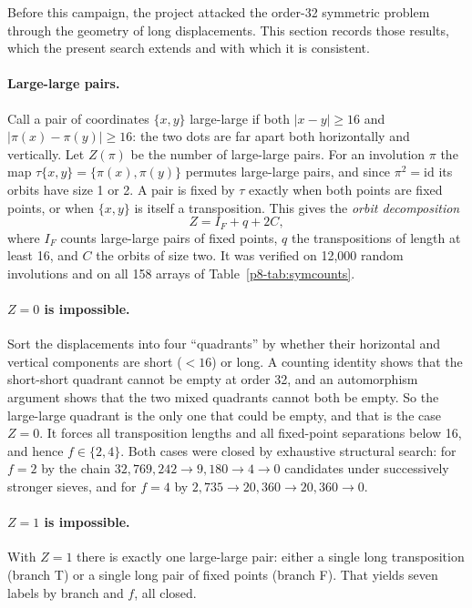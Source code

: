 \documentclass[11pt,a4paper,oneside]{report}
\theoremstyle{definition}
\begin{document}

Before this campaign, the project attacked the order-32 symmetric problem through the
geometry of long displacements. This section records those results, which the present
search extends and with which it is consistent.

\paragraph{Large-large pairs.} Call a pair of coordinates $\{x,y\}$ large-large if
both $|x-y|\ge16$ and $|\pi(x)-\pi(y)|\ge16$: the two dots are far apart both horizontally and
vertically. Let $Z(\pi)$ be the number of large-large pairs. For an involution $\pi$ the map
$\tau\{x,y\}=\{\pi(x),\pi(y)\}$ permutes large-large pairs, and since $\pi^2=\mathrm{id}$ its
orbits have size 1 or 2. A pair is fixed by $\tau$ exactly when both points are fixed points,
or when $\{x,y\}$ is itself a transposition. This gives the \emph{orbit decomposition}
\[
Z = I_F + q + 2C,
\]
where $I_F$ counts large-large pairs of fixed points, $q$ the transpositions of length at
least 16, and $C$ the orbits of size two. It was verified on 12{,}000 random involutions and
on all 158 arrays of Table~\ref{p8-tab:symcounts}.

\paragraph{$Z=0$ is impossible.} Sort the displacements into four ``quadrants'' by whether
their horizontal and vertical components are short ($<16$) or long. A counting identity shows
that the short-short quadrant cannot be empty at order 32, and an automorphism argument shows
that the two mixed quadrants cannot both be empty. So the large-large quadrant is the only one
that could be empty, and that is the case $Z=0$. It forces all transposition lengths and all
fixed-point separations below 16, and hence $f\in\{2,4\}$. Both cases were closed by
exhaustive structural search: for $f=2$ by the chain $32{,}769{,}242\to9{,}180\to4\to0$
candidates under successively stronger sieves, and for $f=4$ by
$2{,}735\to20{,}360\to20{,}360\to0$.

\paragraph{$Z=1$ is impossible.} With $Z=1$ there is exactly one large-large pair: either a
single long transposition (branch T) or a single long pair of fixed points (branch F). That
yields seven labels by branch and $f$, all closed.
\end{document}
